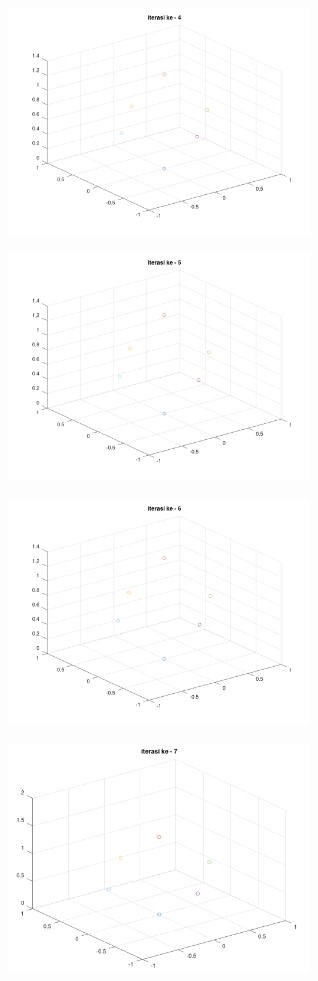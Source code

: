\documentclass[11pt]{article}
\begin{document}
\begin{multicols}{2}
    \includegraphics[width=8cm]{img/Iterasi04.png}

    \includegraphics[width=8cm]{img/Iterasi05.png}

    \includegraphics[width=8cm]{img/Iterasi06.png}

    \includegraphics[width=8cm]{img/Iterasi07.PNG}


\end{multicols}
\end{document}
